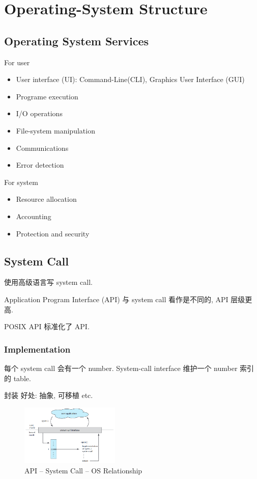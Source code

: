 \newpage
\section{Operating-System Structure}

\subsection{Operating System Services}
For user
\begin{itemize}
    \item User interface (UI): Command-Line(CLI), Graphics User Interface (GUI)
    \item Programe execution
    \item I/O operations
    \item File-system manipulation
    \item Communications 
    \item Error detection
\end{itemize}

For system
\begin{itemize}
    \item Resource allocation
    \item Accounting
    \item Protection and security
\end{itemize}

\subsection{System Call}
使用高级语言写 system call. 

Application Program Interface (API) 与 system call 看作是不同的, API 层级更高. 

POSIX API 标准化了 API.

\subsubsection{Implementation}
每个 system call 会有一个 number. System-call interface 维护一个 number 索引的 table. 

封装 好处: 抽象, 可移植 etc.

\begin{figure}[!htb]
    \centering
    \includegraphics[width=0.42\textwidth]{pic/OS2/API – System Call – OS Relationship}
    \caption{API – System Call – OS Relationship}
\end{figure}

